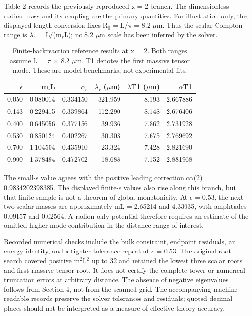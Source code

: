 \documentclass[11pt]{article}
\begin{document}
Table 2 records the previously reproduced x = 2 branch. The dimensionless radion mass and its coupling are the primary quantities. For illustration only, the displayed length conversion fixes R\({}_0\) = L/\(\pi\) = 8.2 \(\mu\)m. Thus the scalar Compton range is \(\lambda\)\({}_r\) = L/(m\({}_r\)L); no 8.2 \(\mu\)m scale has been inferred by the solver.

\begin{table}[htbp]
\centering
\small
\begin{tabular}{rrrrrr}
\toprule
\(\epsilon\) & m\({}_r\)L & \(\alpha\)\({}_r\) & \(\lambda\)\({}_r\) (\(\mu\)m) & \(\lambda\)T1 (\(\mu\)m) & \(\alpha\)T1\\
\midrule
0.050 & 0.080014 & 0.334150 & 321.959 & 8.193 & 2.667886\\
0.143 & 0.229415 & 0.339864 & 112.290 & 8.148 & 2.676406\\
0.400 & 0.645056 & 0.377156 & 39.936 & 7.862 & 2.731928\\
0.530 & 0.850124 & 0.402267 & 30.303 & 7.675 & 2.769692\\
0.700 & 1.104504 & 0.435910 & 23.324 & 7.428 & 2.821690\\
0.900 & 1.378494 & 0.472702 & 18.688 & 7.152 & 2.881968\\
\bottomrule
\end{tabular}
\caption{Finite-backreaction reference results at x = 2. Both ranges assume L = \(\pi\) \(\times\) 8.2 \(\mu\)m. T1 denotes the first massive tensor mode. These are model benchmarks, not experimental fits.}
\end{table}
The small-\(\epsilon\) value agrees with the positive leading correction c\(\alpha\)(2) = 0.9834202398385. The displayed finite-\(\epsilon\) values also rise along this branch, but that finite sample is not a theorem of global monotonicity. At \(\epsilon\) = 0.53, the next two scalar masses are approximately mL = 2.65214 and 4.33035, with amplitudes 0.09157 and 0.02564. A radion-only potential therefore requires an estimate of the omitted higher-mode contribution in the distance range of interest.

Recorded numerical checks include the bulk constraint, endpoint residuals, an energy identity, and a tighter-tolerance repeat at \(\epsilon\) = 0.53. The original root search covered positive m\({}^2\)L\({}^2\) up to 32 and retained the lowest three scalar roots and first massive tensor root. It does not certify the complete tower or numerical truncation errors at arbitrary distance. The absence of negative eigenvalues follows from Section 4, not from the scanned grid. The accompanying machine-readable records preserve the solver tolerances and residuals; quoted decimal places should not be interpreted as a measure of effective-theory accuracy.
\end{document}
